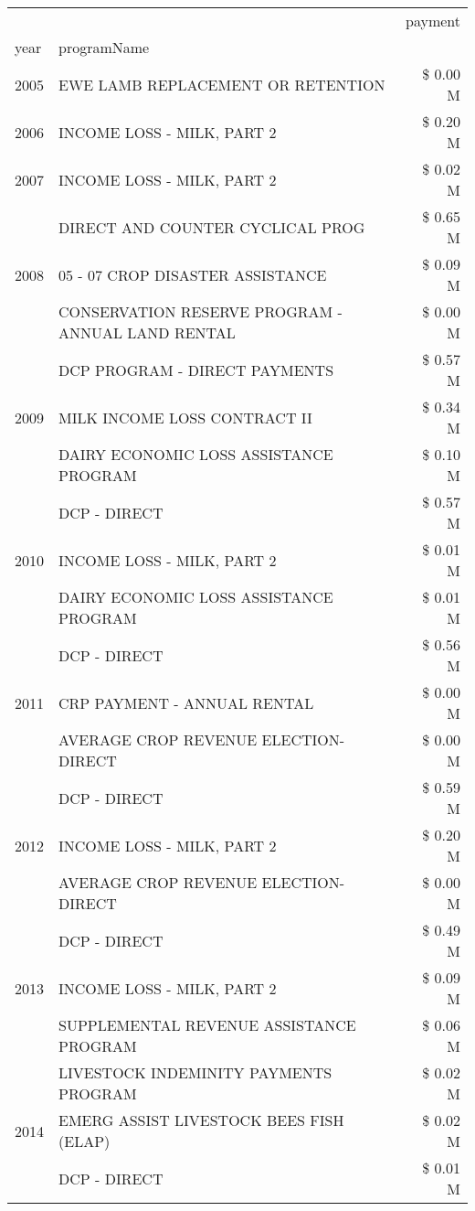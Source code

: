 \begin{tabular}{llr}
\toprule
 &  & payment \\
year & programName &  \\
\midrule
2005 & EWE LAMB REPLACEMENT OR RETENTION & \$ 0.00 M \\
\cline{1-3}
2006 & INCOME LOSS - MILK, PART 2 & \$ 0.20 M \\
\cline{1-3}
2007 & INCOME LOSS - MILK, PART 2 & \$ 0.02 M \\
\cline{1-3}
\multirow[t]{3}{*}{2008} & DIRECT AND COUNTER CYCLICAL PROG & \$ 0.65 M \\
 & 05 - 07 CROP DISASTER ASSISTANCE & \$ 0.09 M \\
 & CONSERVATION RESERVE PROGRAM - ANNUAL LAND RENTAL & \$ 0.00 M \\
\cline{1-3}
\multirow[t]{3}{*}{2009} & DCP PROGRAM - DIRECT PAYMENTS & \$ 0.57 M \\
 & MILK INCOME LOSS CONTRACT II & \$ 0.34 M \\
 & DAIRY ECONOMIC LOSS ASSISTANCE PROGRAM & \$ 0.10 M \\
\cline{1-3}
\multirow[t]{3}{*}{2010} & DCP - DIRECT & \$ 0.57 M \\
 & INCOME LOSS - MILK, PART 2 & \$ 0.01 M \\
 & DAIRY ECONOMIC LOSS ASSISTANCE PROGRAM & \$ 0.01 M \\
\cline{1-3}
\multirow[t]{3}{*}{2011} & DCP - DIRECT & \$ 0.56 M \\
 & CRP PAYMENT - ANNUAL RENTAL & \$ 0.00 M \\
 & AVERAGE CROP REVENUE ELECTION-DIRECT & \$ 0.00 M \\
\cline{1-3}
\multirow[t]{3}{*}{2012} & DCP - DIRECT & \$ 0.59 M \\
 & INCOME LOSS - MILK, PART 2 & \$ 0.20 M \\
 & AVERAGE CROP REVENUE ELECTION-DIRECT & \$ 0.00 M \\
\cline{1-3}
\multirow[t]{3}{*}{2013} & DCP - DIRECT & \$ 0.49 M \\
 & INCOME LOSS - MILK, PART 2 & \$ 0.09 M \\
 & SUPPLEMENTAL REVENUE ASSISTANCE PROGRAM & \$ 0.06 M \\
\cline{1-3}
\multirow[t]{3}{*}{2014} & LIVESTOCK INDEMINITY PAYMENTS PROGRAM & \$ 0.02 M \\
 & EMERG ASSIST LIVESTOCK BEES FISH (ELAP) & \$ 0.02 M \\
 & DCP - DIRECT & \$ 0.01 M \\
\cline{1-3}

\end{tabular}
